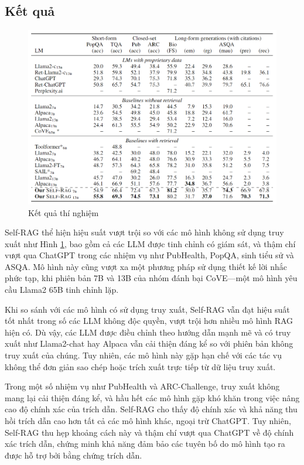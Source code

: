 \documentclass{article}
\begin{document}
\subsection{Kết quả}
\begin{figure} 
    \centering
    \includegraphics[scale = 0.7]{experiments_results.png}
    \caption{Kết quả thí nghiệm}
    \label{fig:experiments_results}
\end{figure}

Self-RAG thể hiện hiệu suất vượt trội so với các mô hình không sử dụng truy xuất như Hình \ref{fig:experiments_results}, bao gồm cả các LLM được tinh chỉnh có giám sát, và thậm chí vượt qua ChatGPT trong các nhiệm vụ như PubHealth, PopQA, sinh tiểu sử và ASQA. Mô hình này cũng vượt xa một phương pháp sử dụng thiết kế lời nhắc phức tạp, khi phiên bản 7B và 13B của nhóm đánh bại CoVE—một mô hình yêu cầu Llama2 65B tinh chỉnh lặp.

Khi so sánh với các mô hình có sử dụng truy xuất, Self-RAG vẫn đạt hiệu suất tốt nhất trong số các LLM không độc quyền, vượt trội hơn nhiều mô hình RAG hiện có. Dù vậy, các LLM được điều chỉnh theo hướng dẫn mạnh mẽ và có truy xuất như Llama2-chat hay Alpaca vẫn cải thiện đáng kể so với phiên bản không truy xuất của chúng. Tuy nhiên, các mô hình này gặp hạn chế với các tác vụ không thể đơn giản sao chép hoặc trích xuất trực tiếp từ dữ liệu truy xuất.

Trong một số nhiệm vụ như PubHealth và ARC-Challenge, truy xuất không mang lại cải thiện đáng kể, và hầu hết các mô hình gặp khó khăn trong việc nâng cao độ chính xác của trích dẫn. Self-RAG cho thấy độ chính xác và khả năng thu hồi trích dẫn cao hơn tất cả các mô hình khác, ngoại trừ ChatGPT. Tuy nhiên, Self-RAG thu hẹp khoảng cách này và thậm chí vượt qua ChatGPT về độ chính xác trích dẫn, chứng minh khả năng đảm bảo các tuyên bố do mô hình tạo ra được hỗ trợ bởi bằng chứng trích dẫn.
\end{document}
